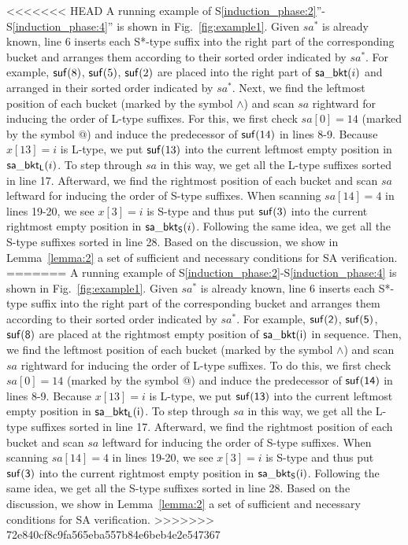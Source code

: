 \documentclass[10pt,journal,compsoc]{IEEEtran}
\begin{document}
<<<<<<< HEAD
A running example of S\ref{induction_phase:2}''-S\ref{induction_phase:4}'' is shown in Fig.~\ref{fig:example1}. Given $sa^*$ is already known, line 6 inserts each S*-type suffix into the right part of the corresponding bucket and arranges them according to their sorted order indicated by $sa^*$. For example, ${\sf suf}(8)$, ${\sf suf}(5)$, ${\sf suf}(2)$ are placed into the right part of ${\sf sa\_bkt}(i)$ and arranged in their sorted order indicated by $sa^*$. Next, we find the leftmost position of each bucket (marked by the symbol $\wedge$) and scan $sa$ rightward for inducing the order of L-type suffixes. For this, we first check $sa[0] = 14$ (marked by the symbol @) and induce the predecessor of ${\sf suf}(14)$ in lines 8-9. Because $x[13] = i$ is L-type, we put ${\sf suf}(13)$ into the current leftmost empty position in ${\sf sa\_bkt_L}(i)$. To step through $sa$ in this way, we get all the L-type suffixes sorted in line 17. Afterward, we find the rightmost position of each bucket and scan $sa$ leftward for inducing the order of S-type suffixes. When scanning $sa[14] = 4$ in lines 19-20, we see $x[3] = i$ is S-type and thus put ${\sf suf}(3)$ into the current rightmost empty position in ${\sf sa\_bkt_S}(i)$. Following the same idea, we get all the S-type suffixes sorted in line 28. Based on the discussion, we show in Lemma~\ref{lemma:2} a set of sufficient and necessary conditions for SA verification.
=======
A running example of S\ref{induction_phase:2}-S\ref{induction_phase:4} is shown in Fig.~\ref{fig:example1}. Given $sa^*$ is already known, line 6 inserts each S*-type suffix into the right part of the corresponding bucket and arranges them according to their sorted order indicated by $sa^*$. For example, $\sf suf(2)$, $\sf suf(5)$, $\sf suf(8)$ are placed at the rightmost empty position of $\sf sa\_bkt(i)$ in sequence. Then, we find the leftmost position of each bucket (marked by the symbol $\wedge$) and scan $sa$ rightward for inducing the order of L-type suffixes. To do this, we first check $sa[0] = 14$ (marked by the symbol @) and induce the predecessor of $\sf suf(14)$ in lines 8-9. Because $x[13] = i$ is L-type, we put $\sf suf(13)$ into the current leftmost empty position in $\sf sa\_bkt_L(i)$. To step through $sa$ in this way, we get all the L-type suffixes sorted in line 17. Afterward, we find the rightmost position of each bucket and scan $sa$ leftward for inducing the order of S-type suffixes. When scanning $sa[14] = 4$ in lines 19-20, we see $x[3] = i$ is S-type and thus put $\sf suf(3)$ into the current rightmost empty position in $\sf sa\_bkt_S(i)$. Following the same idea, we get all the S-type suffixes sorted in line 28. Based on the discussion, we show in Lemma~\ref{lemma:2} a set of sufficient and necessary conditions for SA verification.
>>>>>>> 72e840cf8c9fa565eba557b84e6beb4e2e547367
\end{document}
